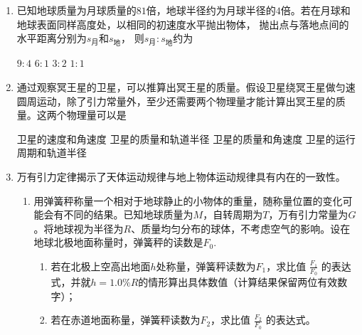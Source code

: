 \begin{enumerate}[leftmargin=0em]
\item 
{}
已知地球质量为月球质量的$ 81 $倍，地球半径约为月球半径的$ 4 $倍。若在月球和地球表面同样高度处，以相同的初速度水平抛出物体， 抛出点与落地点间的水平距离分别为$ s_{ \text{月} } $和$ s_{ \text{地} } $， 则$ s_{ \text{月} }:s_{ \text{地} } $约为  

\fourchoices
{$ 9:4 $ }
{$ 6:1 $}
{$ 3:2 $ }
{$ 1:1 $}



\item 
{}
通过观察冥王星的卫星，可以推算出冥王星的质量。假设卫星绕冥王星做匀速圆周运动，除了引力常量外，至少还需要两个物理量才能计算出冥王星的质量。这两个物理量可以是  

\fourchoices
{卫星的速度和角速度}
{卫星的质量和轨道半径}
{卫星的质量和角速度}
{卫星的运行周期和轨道半径}







\newpage
\item 
{}
万有引力定律揭示了天体运动规律与地上物体运动规律具有内在的一致性。
\begin{enumerate}
\renewcommand{\labelenumi}{\arabic{enumi}.}
\item
用弹簧秤称量一个相对于地球静止的小物体的重量，随称量位置的变化可能会有不同的结果。已知地球质量为$ M $，自转周期为$ T $，万有引力常量为$ G $。将地球视为半径为$ R $、质量均匀分布的球体，不考虑空气的影响。设在地球北极地面称量时，弹簧秤的读数是$ F_{0} $.

\begin{enumerate}
\renewcommand{\labelenumiii}{\alph{enumiii}.}
\item
若在北极上空高出地面$ h $处称量，弹簧秤读数为$ F_{1} $，求比值 $\frac { F _ { 1 } } { F _ { 0 } }$ 的表达式，并就$ h=1.0 \% R $的情形算出具体数值（计算结果保留两位有效数字）；
\item 
若在赤道地面称量，弹簧秤读数为$ F_{2} $，求比值 $\frac { F _ { 2 } } { F _ { 0 } }$ 的表达式。




\end{enumerate}
\end{enumerate}
\end{enumerate}
